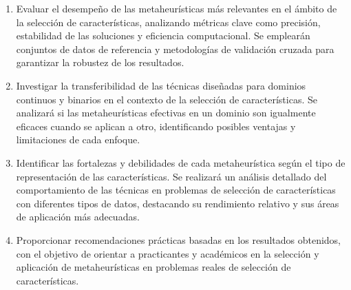 \begin{enumerate}
    \item Evaluar el desempeño de las metaheurísticas más relevantes en el ámbito de la
          selección de características, analizando métricas clave como precisión, estabilidad de
          las soluciones y eficiencia computacional. Se emplearán conjuntos de datos de referencia
          y metodologías de validación cruzada para garantizar la robustez de los resultados.

    \item Investigar la transferibilidad de las técnicas diseñadas para dominios continuos y
          binarios en el contexto de la selección de características. Se analizará si las
          metaheurísticas efectivas en un dominio son igualmente eficaces cuando se aplican a
          otro, identificando posibles ventajas y limitaciones de cada enfoque.

    \item Identificar las fortalezas y debilidades de cada metaheurística según el tipo de
          representación de las características. Se realizará un análisis detallado del
          comportamiento de las técnicas en problemas de selección de características con
          diferentes tipos de datos, destacando su rendimiento relativo y sus áreas de aplicación
          más adecuadas.

    \item Proporcionar recomendaciones prácticas basadas en los resultados obtenidos, con el
          objetivo de orientar a practicantes y académicos en la selección y aplicación de
          metaheurísticas en problemas reales de selección de características.
\end{enumerate}